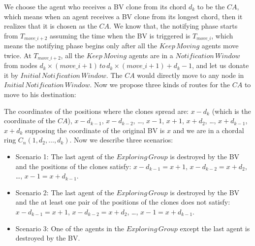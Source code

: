 \documentclass[conference]{IEEEtran}
\begin{document}

We choose the agent who receives a BV clone from its chord $d_k$ to be the $CA$, which means when an agent receives a BV clone from its longest chord, then it realizes that it is chosen as the $CA$. We know that, the notifying phase starts from $T_{move\_{i+2}}$ assuming the time when the BV is triggered is $T_{move\_i}$, which means the notifying phase begins only after all the $Keep\,Moving$ agents move twice. At $T_{move\_{i+2}}$, all the $Keep\,Moving$ agents are in a $Notification\,Window$ from nodes $d_k\times(move\_{i}+1)\,to\,d_k\times(move\_{i}+1) + d_{k}-1$, and let us donate it by $Initial\,Notification\,Window$. The $CA$ would directly move to any node in $Initial\,Notification\,Window$. Now we propose three kinds of routes for the $CA$ to move to his destination:

The coordinates of the positions where the clones spread are: $x-d_k$ (which is the coordinate of the $CA$), $x-d_{k-1}$, $x-d_{k-2}$, \ldots, $x-1$, $x+1$, $x+d_2$, \ldots, $x+d_{k-1}$, $x+d_{k}$ supposing the coordinate of the original BV is $x$ and we are in a chordal ring $C_n(1, d_2,\ldots, d_k)$.
 Now we describe three scenarios:
\begin{itemize}
\item Scenario 1: The last agent of the $Exploring\,Group$ is destroyed by the BV and the positions of the clones satisfy: $x-d_{k-1}=x+1$, $x-d_{k-2}=x+d_2$, \ldots, $x-1=x+d_{k-1}$. 
\item Scenario 2: The last agent of the $Exploring\,Group$ is destroyed by the BV and the at least one pair of the positions of the clones does not satisfy: $x-d_{k-1}=x+1$, $x-d_{k-2}=x+d_2$, \ldots, $x-1=x+d_{k-1}$. 
\item Scenario 3: One of the agents in the $Exploring\,Group$ except the last agent is destroyed by the BV.
\end{itemize}
\end{document}
